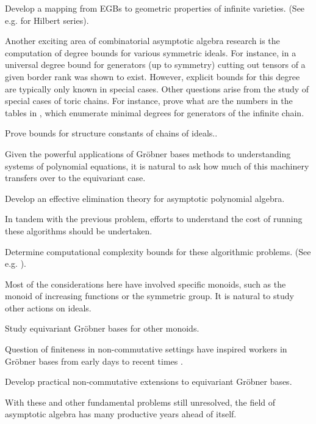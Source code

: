 \begin{problem}
Develop a mapping from EGBs to geometric properties of infinite varieties.  (See e.g. \cite{Nagel, krone2016hilbert} for Hilbert series).
\end{problem}

Another exciting area of combinatorial asymptotic algebra research is the computation of degree bounds for various symmetric ideals. 
For instance, in \cite{draisma2014bounded, Draisma12f} a universal degree bound for generators (up to symmetry) cutting out tensors of a given border rank was shown to exist.  However, explicit bounds for this degree are typically only known in special cases.  Other questions arise from the study of special cases of toric chains.  For instance, prove what are the numbers in the tables in \cite{KKL:equivariant-markov, Hillar13, hillar2016corrigendum}, which enumerate minimal degrees for generators of the infinite chain.

\begin{problem}
Prove bounds for structure constants of chains of ideals..
\end{problem}

Given the powerful applications of Gr\"obner bases methods to understanding systems of polynomial equations, it is natural to ask how much of this machinery transfers over to the equivariant case.

\begin{problem}
Develop an effective elimination theory for asymptotic polynomial algebra.
\end{problem}

In tandem with the previous problem, efforts to understand the cost of running these algorithms should be undertaken.

\begin{problem}
Determine computational complexity bounds for these algorithmic problems.  (See e.g. \cite{yap2000fundamental}).
\end{problem}

Most of the considerations here have involved specific monoids, such as the monoid of increasing functions or the symmetric group.  It is natural to study other actions on ideals.

\begin{problem}
Study equivariant Gr\"obner bases for other monoids.
\end{problem}

Question of finiteness in non-commutative settings have inspired workers in Gr\"obner bases from early days \cite{shirshov1962some, bokut1976embeddings, bergman1978diamond} to recent times \cite{drensky2006grobner, la2009letterplace}.

\begin{problem}
Develop practical non-commutative extensions to equivariant Gr\"obner bases.
\end{problem}

With these and other fundamental problems still unresolved, the field of asymptotic algebra has many productive years ahead of itself.



